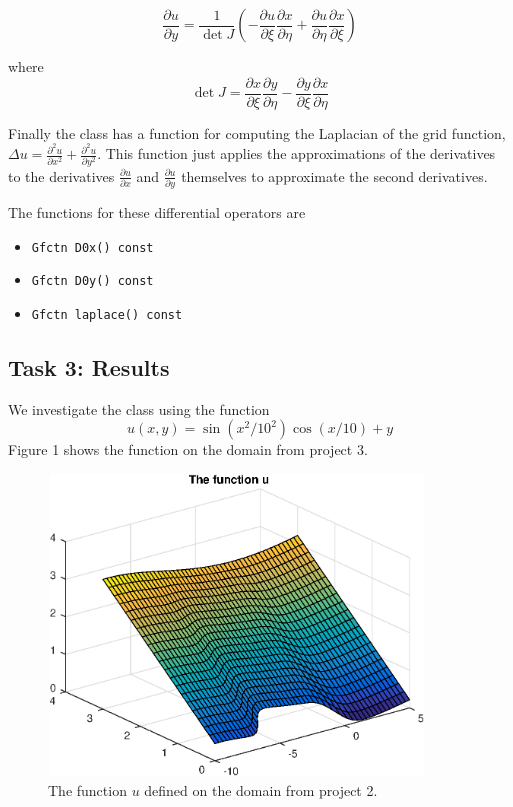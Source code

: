 \documentclass[a4paper,10pt]{article}
\begin{document}
$$\frac{\partial u}{\partial y} = \frac{1}{\det J} \left(-\frac{\partial u}{\partial \xi} \frac{\partial x}{\partial \eta} + \frac{\partial u}{\partial \eta} \frac{\partial x}{\partial \xi}  \right)$$
 
where 
$$\det J = \frac{\partial x}{\partial \xi} \frac{\partial y}{\partial \eta} - \frac{\partial y}{\partial \xi} \frac{\partial x}{\partial \eta}   $$

Finally the class has a function for computing the Laplacian of the grid function, 
$\Delta u = \tfrac{\partial^2 u}{\partial x^2} + \tfrac{\partial^2 u}{\partial y^2}$. This function just applies the approximations of the derivatives to the derivatives $\tfrac{\partial u}{\partial x}$ and $\tfrac{\partial u}{\partial y}$ themselves to approximate the second derivatives. 

The functions for these differential operators are
\begin{itemize}
  \item
    \texttt{Gfctn D0x() const}
  \item
    \texttt{Gfctn D0y() const}
  \item
    \texttt{Gfctn laplace() const}
\end{itemize}
    




\subsection*{Task 3: Results}
We investigate the class using the function
\begin{equation*}
  u(x,y) = \sin (x^2/10^2) \cos (x/10) + y
\end{equation*}
Figure 1 shows the function on the domain from project 3.
\begin{figure}[ht!]
  \centering
  \includegraphics[width = 10cm, height = 8cm]{ufctn}
  \begin{minipage}[t]{100mm}
    \caption{
      The function $u$ defined on the domain from project 2.
    }\label{FIG_jjj}
  \end{minipage}
\end{figure}
\end{document}
